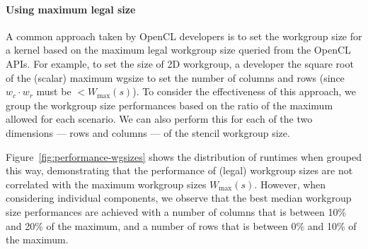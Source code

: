 \documentclass[nonatbib,preprint,10pt]{sigplanconf}
\begin{document}
\paragraph{Using maximum legal size}

A common approach taken by OpenCL developers is to set the workgroup
size for a kernel based on the maximum legal workgroup size queried
from the OpenCL APIs. For example, to set the size of 2D workgroup, a
developer the square root of the (scalar) maximum wgsize to set the
number of columns and rows (since $w_c \cdot w_r$ must be
$< W_{\max}(s)$). To consider the effectiveness of this approach, we
group the workgroup size performances based on the ratio of the
maximum allowed for each scenario. We can also perform this for each
of the two dimensions --- rows and columns --- of the stencil
workgroup size.

Figure~\ref{fig:performance-wgsizes} shows the distribution of
runtimes when grouped this way, demonstrating that the performance of
(legal) workgroup sizes are not correlated with the maximum workgroup
sizes $W_{\max}(s)$. However, when considering individual components,
we observe that the best median workgroup size performances are
achieved with a number of columns that is between 10\% and 20\% of the
maximum, and a number of rows that is between 0\% and 10\% of the
maximum.

\end{document}

